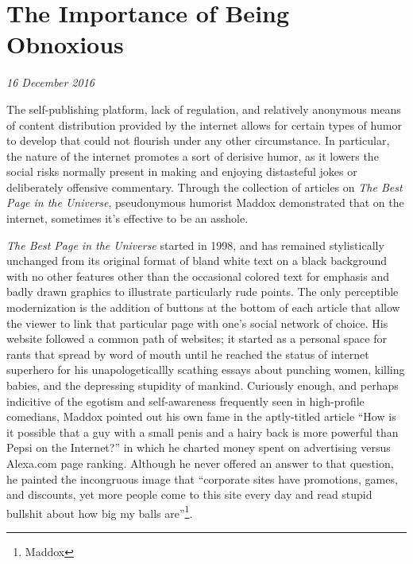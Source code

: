 \section{The Importance of Being Obnoxious}

\textit{16 December 2016}

The self-publishing platform, lack of regulation, and relatively anonymous means
of content distribution provided by the internet allows for certain types of
humor to develop that could not flourish under any other circumstance. In
particular, the nature of the internet promotes a sort of derisive humor, as it
lowers the social risks normally present in making and enjoying distasteful
jokes or deliberately offensive commentary. Through the collection of articles
on \textit{The Best Page in the Universe}, pseudonymous humorist Maddox
demonstrated that on the internet, sometimes it's effective to be an asshole.

\textit{The Best Page in the Universe} started in 1998, and has remained
stylistically unchanged from its original format of bland white text on a black
background with no other features other than the occasional colored text for
emphasis and badly drawn graphics to illustrate particularly rude points. The
only perceptible modernization is the addition of buttons at the bottom of each
article that allow the viewer to link that particular page with one's social
network of choice. His website followed a common path of websites; it started as
a personal space for rants that spread by word of mouth until he reached the
status of internet superhero for his unapologeticallly scathing essays about
punching women, killing babies, and the depressing stupidity of mankind.
Curiously enough, and perhaps indicitive of the egotism and self-awareness
frequently seen in high-profile comedians, Maddox pointed out his own fame in
the aptly-titled article ``How is it possible that a guy with a small penis and
a hairy back is more powerful than Pepsi on the Internet?'' in which he charted
money spent on advertising versus Alexa.com page ranking. Although he never
offered an answer to that question, he painted the incongruous image that
``corporate sites have promotions, games, and discounts, yet more people come to
this site every day and read stupid bullshit about how big my balls
are''\footnote{Maddox}.

